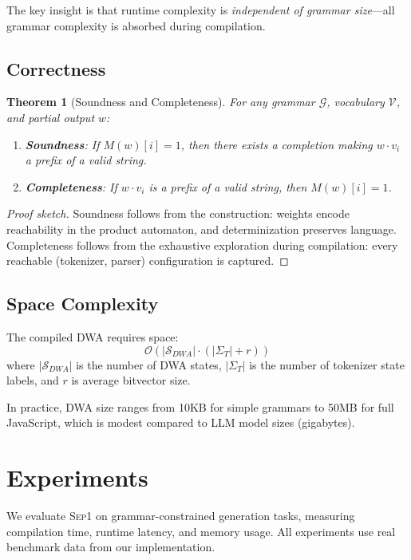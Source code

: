 \documentclass[11pt,a4paper]{article}
\newcommand{\bigO}{\mathcal{O}}
\newcommand{\vocab}{\mathcal{V}}
\newcommand{\grammar}{\mathcal{G}}
\newcommand{\states}{\mathcal{S}}
\newcommand{\sep}{\textsc{Sep1}}
\theoremstyle{plain}
\newtheorem{theorem}{Theorem}[section]
\theoremstyle{definition}
\theoremstyle{remark}
\begin{document}
The key insight is that runtime complexity is \emph{independent of grammar size}---all grammar complexity is absorbed during compilation.

\subsection{Correctness}

\begin{theorem}[Soundness and Completeness]
For any grammar $\grammar$, vocabulary $\vocab$, and partial output $w$:
\begin{enumerate}
\item \textbf{Soundness}: If $M(w)[i] = 1$, then there exists a completion making $w \cdot v_i$ a prefix of a valid string.
\item \textbf{Completeness}: If $w \cdot v_i$ is a prefix of a valid string, then $M(w)[i] = 1$.
\end{enumerate}
\end{theorem}

\begin{proof}[Proof sketch]
Soundness follows from the construction: weights encode reachability in the product automaton, and determinization preserves language. Completeness follows from the exhaustive exploration during compilation: every reachable (tokenizer, parser) configuration is captured.
\end{proof}

\subsection{Space Complexity}

The compiled DWA requires space:
\[
\bigO(|\states_{DWA}| \cdot (|\Sigma_T| + r))
\]
where $|\states_{DWA}|$ is the number of DWA states, $|\Sigma_T|$ is the number of tokenizer state labels, and $r$ is average bitvector size.

In practice, DWA size ranges from 10KB for simple grammars to 50MB for full JavaScript, which is modest compared to LLM model sizes (gigabytes).

\section{Experiments}
\label{sec:experiments}

We evaluate \sep{} on grammar-constrained generation tasks, measuring compilation time, runtime latency, and memory usage. All experiments use real benchmark data from our implementation.
\end{document}
